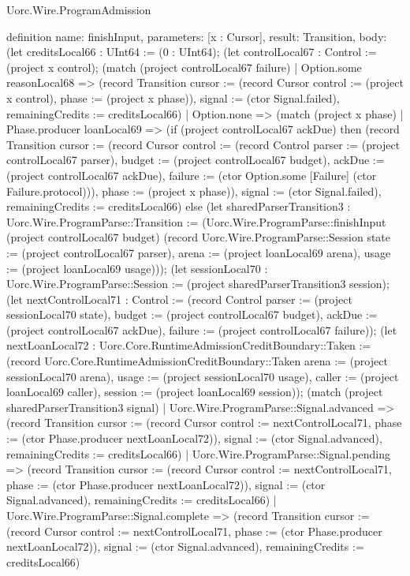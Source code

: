 \begin{lexlean}{Uorc.Wire.ProgramAdmission}
\begin{semanticmodule}
definition{
  name: finishInput,
  parameters: [x : Cursor],
  result: Transition,
  body: (let creditsLocal66 : UInt64 := (0 : UInt64); (let controlLocal67 : Control := (project x control); (match (project controlLocal67 failure)
    | Option.some reasonLocal68 => (record Transition {cursor := (record Cursor {control := (project x control), phase := (project x phase)}), signal := (ctor Signal.failed), remainingCredits := creditsLocal66})
    | Option.none => (match (project x phase)
      | Phase.producer loanLocal69 => (if (project controlLocal67 ackDue) then (record Transition {cursor := (record Cursor {control := (record Control {parser := (project controlLocal67 parser), budget := (project controlLocal67 budget), ackDue := (project controlLocal67 ackDue), failure := (ctor Option.some [Failure] (ctor Failure.protocol))}), phase := (project x phase)}), signal := (ctor Signal.failed), remainingCredits := creditsLocal66}) else (let sharedParserTransition3 : Uorc.Wire.ProgramParse::Transition := (Uorc.Wire.ProgramParse::finishInput (project controlLocal67 budget) (record Uorc.Wire.ProgramParse::Session {state := (project controlLocal67 parser), arena := (project loanLocal69 arena), usage := (project loanLocal69 usage)})); (let sessionLocal70 : Uorc.Wire.ProgramParse::Session := (project sharedParserTransition3 session); (let nextControlLocal71 : Control := (record Control {parser := (project sessionLocal70 state), budget := (project controlLocal67 budget), ackDue := (project controlLocal67 ackDue), failure := (project controlLocal67 failure)}); (let nextLoanLocal72 : Uorc.Core.RuntimeAdmissionCreditBoundary::Taken := (record Uorc.Core.RuntimeAdmissionCreditBoundary::Taken {arena := (project sessionLocal70 arena), usage := (project sessionLocal70 usage), caller := (project loanLocal69 caller), session := (project loanLocal69 session)}); (match (project sharedParserTransition3 signal)
        | Uorc.Wire.ProgramParse::Signal.advanced => (record Transition {cursor := (record Cursor {control := nextControlLocal71, phase := (ctor Phase.producer nextLoanLocal72)}), signal := (ctor Signal.advanced), remainingCredits := creditsLocal66})
        | Uorc.Wire.ProgramParse::Signal.pending => (record Transition {cursor := (record Cursor {control := nextControlLocal71, phase := (ctor Phase.producer nextLoanLocal72)}), signal := (ctor Signal.advanced), remainingCredits := creditsLocal66})
        | Uorc.Wire.ProgramParse::Signal.complete => (record Transition {cursor := (record Cursor {control := nextControlLocal71, phase := (ctor Phase.producer nextLoanLocal72)}), signal := (ctor Signal.advanced), remainingCredits := creditsLocal66})
}
\end{semanticmodule}
\end{lexlean}
